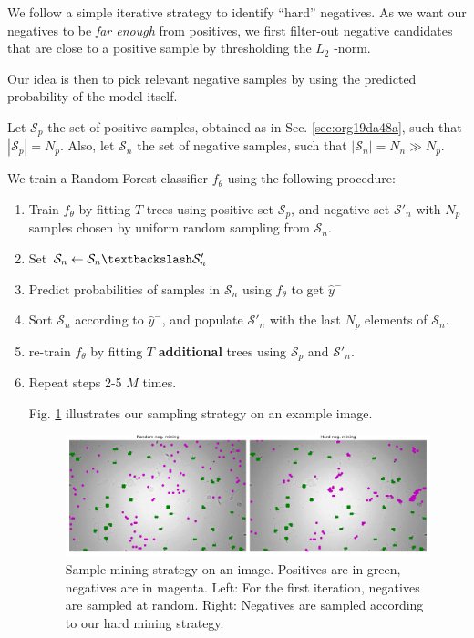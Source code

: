 \documentclass[11pt]{article}
\begin{document}
We follow a simple iterative strategy to identify ``hard'' negatives.
As we want our negatives to be \emph{far enough} from positives, we first filter-out negative candidates that are
close to a positive sample by thresholding the \(L_2\) -norm.

Our idea is then to pick relevant negative samples by using the predicted probability of the model itself.

Let \(\mathcal{S}_p\) the set of positive samples, obtained as in Sec. \ref{sec:org19da48a}, such that \(|\mathcal{S}_p|=N_p\).
Also, let \(\mathcal{S}_n\) the set of negative samples, such that \(|\mathcal{S}_n|=N_n \gg N_p\).


We train a Random Forest classifier \(f_\theta\) using the following procedure:

\begin{enumerate}
\item Train \(f_\theta\) by fitting \(T\) trees using positive set \(\mathcal{S}_p\), and negative set \(\mathcal{S}'_n\) with \(N_p\)
samples chosen by uniform random sampling from \(\mathcal{S}_n\).
\item Set \(\mathcal{S}_n \leftarrow \mathcal{S}_n \textbackslash \mathcal{S}'_n\)
\item Predict probabilities of samples in \(\mathcal{S}_n\) using \(f_\theta\) to get \(\hat{y}^-\)
\item Sort \(\mathcal{S}_n\) according to \(\hat{y}^-\), and populate
\(\mathcal{S}'_n\) with the last \(N_p\) elements of \(\mathcal{S}_n\).
\item re-train \(f_\theta\) by fitting \(T\) \textbf{additional} trees using \(\mathcal{S}_p\) and \(\mathcal{S}'_n\).
\item Repeat steps 2-5 \(M\) times.

Fig. \ref{fig:orge90496b} illustrates our sampling strategy on an example image.

\begin{figure}[htbp]
\centering
\includegraphics[width=.9\linewidth]{./mining_prev.png}
\caption{\label{fig:orge90496b}Sample mining strategy on an image. Positives are in green, negatives are in magenta. Left: For the first iteration, negatives are sampled at random. Right: Negatives are sampled according to our hard mining strategy.}
\end{figure}
\end{enumerate}
\end{document}

